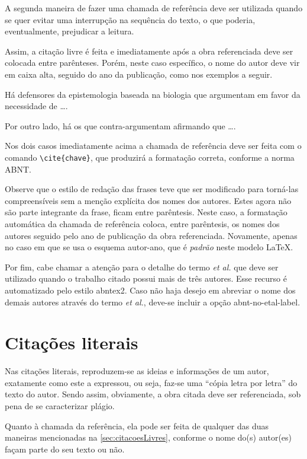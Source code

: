 \begin{apendicesenv}
A segunda maneira de fazer uma chamada de referência deve ser utilizada quando se quer evitar uma interrupção na sequência do texto, o que poderia, eventualmente, prejudicar a leitura.

Assim, a citação livre é feita e imediatamente após a obra referenciada deve ser colocada entre parênteses. Porém, neste caso específico, o nome do autor deve vir em caixa alta, seguido do ano da publicação, como nos exemplos a seguir.

Há defensores da epistemologia baseada na biologia que argumentam em favor da necessidade de \ldots \cite{Maturana2003}.

Por outro lado, há os que contra-argumentam afirmando que \ldots  \cite{Barbosa2004}.

Nos dois casos imediatamente acima a chamada de referência deve ser feita com o comando \verb|\cite{chave}|, que produzirá a formatação correta, conforme a norma ABNT.

Observe que o estilo de redação das frases teve que ser modificado para torná-las compreensíveis sem a menção explícita dos nomes dos autores. Estes agora não são parte integrante da frase, ficam entre parêntesis. Neste caso, a formatação automática da chamada de referência coloca, entre parêntesis, os nomes dos autores seguido pelo ano de publicação da obra referenciada. Novamente, apenas no caso em que se usa o esquema autor-ano, que é \textit{padrão} neste modelo \LaTeX{}.

Por fim, cabe chamar a atenção para o detalhe do termo \textit{et al.} que deve ser utilizado quando o trabalho citado possui mais de três autores. Esse recurso é automatizado pelo estilo {\ttfamily abntex2}. Caso não haja desejo em abreviar o nome dos demais autores através do termo \textit{et al.}, deve-se incluir a opção {\ttfamily abnt-no-etal-label}. 



\section{Citações literais}
\label{sec:citacoesLiterais}

Nas citações literais, reproduzem-se as ideias e informações de um autor, exatamente como este a expressou, ou seja, faz-se uma ``cópia letra por letra'' do texto do autor. Sendo assim, obviamente, a obra citada deve ser referenciada, sob pena de se caracterizar plágio.

Quanto à chamada da referência, ela pode ser feita de qualquer das duas maneiras mencionadas na \autoref{sec:citacoesLivres}, conforme o nome do(s) autor(es) façam parte do seu texto ou não.


\end{apendicesenv}
